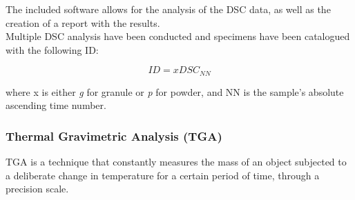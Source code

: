 \documentclass[a4paper]{article}
\begin{document}
                The included software allows for the analysis of the 
                DSC data, as well as the creation of a report with the results. \\
                Multiple DSC analysis have been conducted and specimens have been catalogued with the following ID: 

                \begin{equation}
                    ID = xDSC_{NN}
                    \label{eq:DSC_ID}
                \end{equation}

                where x is either \textit{g} for granule or \textit{p} for powder, and NN is the sample's absolute 
                ascending time number. \\

%
%
                \clearpage

        \subsubsection{Thermal Gravimetric Analysis (TGA)\label{TGA_Analysis}}
        
        TGA is a technique that constantly measures the mass of an object subjected to a deliberate 
        change in temperature for a certain period of time, through a precision scale. 
\end{document}

